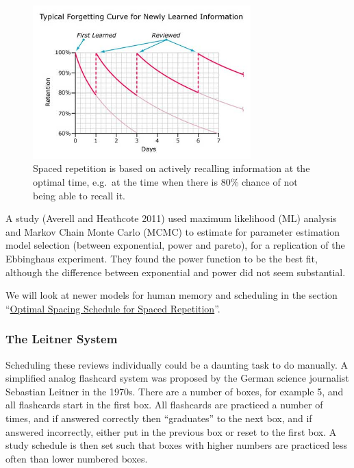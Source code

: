 \begin{figure}
\centering
\includegraphics[width=0.75000\textwidth]{assets/spaced_repetition.jpg}
\caption[Spaced repetition is based on actively recalling information at
the optimal time, e.g.~at the time when there is 80\% chance of not
being able to recall it.]{Spaced repetition is based on actively
recalling information at the optimal time, e.g.~at the time when there
is 80\% chance of not being able to recall
it\footnotemark{}.}\label{fig:sr}
\end{figure}

A study (Averell and Heathcote 2011) used maximum likelihood (ML)
analysis and Markov Chain Monte Carlo (MCMC) to estimate for parameter
estimation model selection (between exponential, power and pareto), for
a replication of the Ebbinghaus experiment. They found the power
function to be the best fit, although the difference between exponential
and power did not seem substantial.

We will look at newer models for human memory and scheduling in the
section
``\protect\hyperlink{optimal-spacing-schedule-for-spaced-repetition}{Optimal
Spacing Schedule for Spaced Repetition}''.

\subsubsection{The Leitner System}\label{the-leitner-system}

Scheduling these reviews individually could be a daunting task to do
manually. A simplified analog flashcard system was proposed by the
German science journalist Sebastian Leitner in the 1970s. There are a
number of boxes, for example 5, and all flashcards start in the first
box. All flashcards are practiced a number of times, and if answered
correctly then ``graduates'' to the next box, and if answered
incorrectly, either put in the previous box or reset to the first box. A
study schedule is then set such that boxes with higher numbers are
practiced less often than lower numbered boxes.

